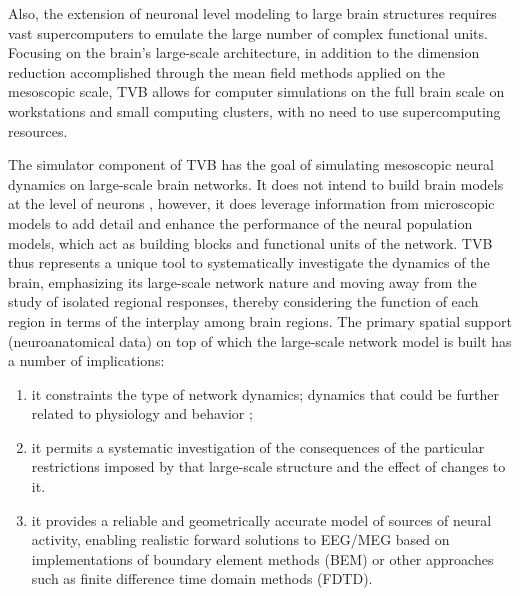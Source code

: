 \documentclass{bioinfo}
\begin{document}
    Also, the extension of neuronal level modeling to large brain structures
    requires vast supercomputers to emulate the large number of complex
    functional units.  {Focusing on the brain's large-scale architecture, in addition
    to the dimension reduction accomplished through the mean field methods
    applied on the mesoscopic scale, TVB allows for computer simulations on
    the full brain scale on workstations and small computing clusters, with no
    need to use supercomputing resources.}
    
    The simulator component of TVB has the goal of simulating mesoscopic
    neural dynamics on large-scale brain networks. It does not intend to
    build brain models at the level of neurons  \citep{Goodman_2009,  Cornelis_2012},
    however, it does leverage information  from microscopic models to add
    detail and enhance the performance of  the neural population models, which
    act as building blocks and functional units of the network. TVB thus
    represents a unique tool to systematically  investigate the dynamics of
    the brain, emphasizing its large-scale network  nature and moving away
    from the study of isolated regional responses, thereby considering the
    function of each region in terms of the interplay among brain regions. The
    primary spatial support (neuroanatomical data)  on top of which the large-scale 
    network model is built has a number of  implications:
    
    \begin{enumerate}

        \item  it constraints the type of network dynamics; dynamics that 
               could be further related to physiology and behavior 
               \citep{Senden_2012}; 

        \item  it permits a systematic investigation of the consequences of the 
               particular restrictions imposed by that large-scale structure 
               and the effect of changes to it. 

        \item  it provides a reliable and geometrically accurate model of 
               sources of neural activity, enabling realistic forward solutions
               to EEG/MEG based on implementations of boundary element methods 
               (BEM) or other approaches such as finite difference time domain 
               methods (FDTD).
    \end{enumerate}
    
\end{document}
